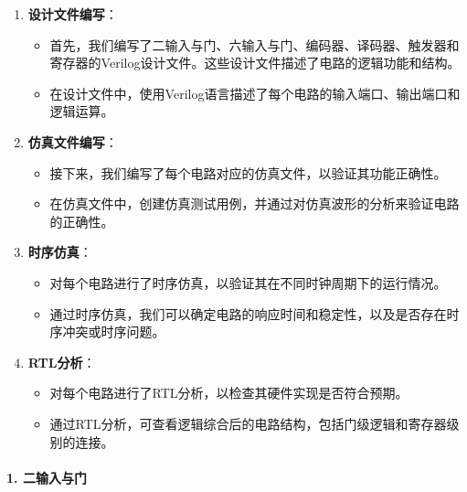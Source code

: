 \documentclass[a4,10pt,zihao=-4]{ctexart}
\begin{document}
\begin{enumerate}
\item
  \textbf{设计文件编写}：

  \begin{itemize}
  \item
    首先，我们编写了二输入与门、六输入与门、编码器、译码器、触发器和寄存器的Verilog设计文件。这些设计文件描述了电路的逻辑功能和结构。
  \item
    在设计文件中，使用Verilog语言描述了每个电路的输入端口、输出端口和逻辑运算。
  \end{itemize}
\item
  \textbf{仿真文件编写}：

  \begin{itemize}
  \item
    接下来，我们编写了每个电路对应的仿真文件，以验证其功能正确性。
  \item
    在仿真文件中，创建仿真测试用例，并通过对仿真波形的分析来验证电路的正确性。
  \end{itemize}
\item
  \textbf{时序仿真}：

  \begin{itemize}
  \item
    对每个电路进行了时序仿真，以验证其在不同时钟周期下的运行情况。
  \item
    通过时序仿真，我们可以确定电路的响应时间和稳定性，以及是否存在时序冲突或时序问题。
  \end{itemize}
\item
  \textbf{RTL分析}：

  \begin{itemize}
  \item
    对每个电路进行了RTL分析，以检查其硬件实现是否符合预期。
  \item
    通过RTL分析，可查看逻辑综合后的电路结构，包括门级逻辑和寄存器级别的连接。
  \end{itemize}
\end{enumerate}

\paragraph{1. 二输入与门}
\end{document}
